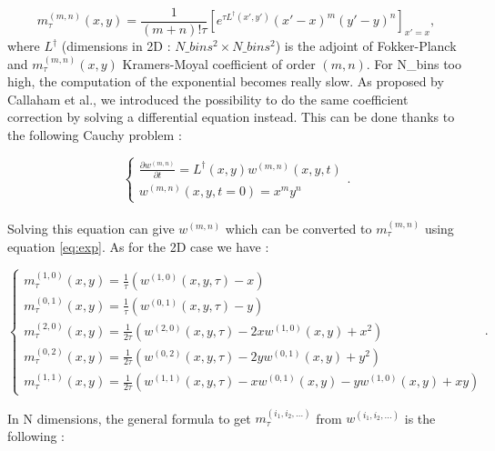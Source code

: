 \documentclass[A4paper]{article}
\begin{document}
\begin{equation} \label{eq:exp}
m_\tau^{(m,n)}(x,y) = \frac{1}{(m+n)! \tau}[e^{\tau L^\dagger (x',y')}(x' - x)^m (y' - y)^n]_{x'=x} ,
\end{equation}
%
where $L^\dagger$ (dimensions in 2D : $N\_bins^2 \times N\_bins^2$) is the adjoint of Fokker-Planck and $m_\tau^{(m,n)}(x,y)$ Kramers-Moyal coefficient of order $(m,n)$. For N\_bins too high, the computation of the exponential becomes really slow. As proposed by Callaham et al., we introduced the possibility to do the same coefficient correction by solving a differential equation instead. This can be done thanks to the following Cauchy problem :

\begin{equation}
\begin{cases}
\frac{\partial w^{(m,n)}}{\partial t} = L^\dagger (x,y) w^{(m,n)} (x,y,t) \\
w^{(m,n)}(x,y,t=0) = x^m y^n
\end{cases}.
\end{equation}

\paragraph{}
Solving this equation can give $w^{(m,n)}$ which can be converted to $m_\tau^{(m,n)}$ using equation \ref{eq:exp}. As for the 2D case we have :

\begin{equation}
\begin{cases}
m_\tau^{(1,0)}(x,y) = \frac{1}{\tau}(w^{(1,0)}(x,y,\tau) - x) \\

m_\tau^{(0,1)}(x,y) = \frac{1}{\tau}(w^{(0,1)}(x,y,\tau) - y)\\

m_\tau^{(2,0)}(x,y) = \frac{1}{2\tau}(w^{(2,0)}(x,y,\tau) - 2 x w^{(1,0)}(x,y) + x^2) \\

 m_\tau^{(0,2)}(x,y) = \frac{1}{2\tau}(w^{(0,2)}(x,y,\tau) - 2 y w^{(0,1)}(x,y) + y^2) \\
 
 m_\tau^{(1,1)}(x,y) =  \frac{1}{2\tau}(w^{(1,1)}(x,y,\tau) - x w^{(0,1)}(x,y) - y w^{(1,0)} (x,y) + x y)
 \end{cases}.
 \end{equation}
 
 In N dimensions, the general formula to get $m_\tau^{(i_1,i_2,\ldots)}$ from $w^{(i_1,i_2,\ldots)}$ is the following :
 
\end{document}
